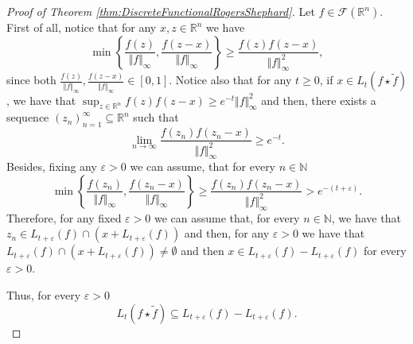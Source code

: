 \documentclass{amsart}
\newcommand{\R}{\mathbb R}
\newcommand{\N}{\mathbb N}
\theoremstyle{remark}
\theoremstyle{definition}
\numberwithin{equation}{section}
\begin{document}
\begin{proof}[Proof of Theorem \ref{thm:DiscreteFunctionalRogersShephard}]
Let $f\in\mathcal{F}(\R^n)$. First of all, notice that for any $x,z\in\R^n$ we have
$$
\min\left\{\frac{f(z)}{\Vert f\Vert_\infty},\frac{f(z-x)}{\Vert f\Vert_\infty}\right\}\geq\frac{f(z)f(z-x)}{\Vert f\Vert_\infty^2},
$$
since both $\frac{f(z)}{\Vert f\Vert_\infty},\frac{f(z-x)}{\Vert f\Vert_\infty}\in [0,1]$. Notice also that for any $t\geq0$, if $x\in L_t(f\star\tilde{f})$, we have that $\displaystyle{\sup_{z\in\R^n}f(z)f(z-x)\geq e^{-t}\Vert f\Vert_\infty^2}$ and then, there exists a sequence $(z_n)_{n=1}^{\infty}\subseteq\R^n$ such that
$$
\lim_{n\to\infty}\frac{f(z_n)f(z_n-x)}{\Vert f\Vert_\infty^2}\geq e^{-t}.
$$
Besides, fixing any $\varepsilon>0$ we can assume, that for every $n\in\N$
$$
\min\left\{\frac{f(z_n)}{\Vert f\Vert_\infty},\frac{f(z_n-x)}{\Vert f\Vert_\infty}\right\}\geq\frac{f(z_n)f(z_n-x)}{\Vert f\Vert_\infty^2}>e^{-(t+\varepsilon)}.
$$
Therefore, for any fixed $\varepsilon>0$ we can assume that, for every $n\in\N$, we have that $z_n\in L_{t+\varepsilon}(f)\cap(x+ L_{t+\varepsilon}(f))$ and then, for any $\varepsilon>0$ we have that $L_{t+\varepsilon}(f)\cap(x+ L_{t+\varepsilon}(f))\neq\emptyset$ and then $x\in L_{t+\varepsilon}(f)-L_{t+\varepsilon}(f)$ for every $\varepsilon>0$.



Thus, for every $\varepsilon>0$
\begin{equation}\label{eq:InclusionSuperlevelSetsRS}
L_t(f\star\tilde{f})\subseteq  L_{t+\varepsilon}(f)-L_{t+\varepsilon}(f).
\end{equation}


\end{proof}
\end{document}
